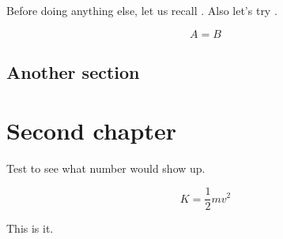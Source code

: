 \documentclass[noocg]{wwwnotes2}
\begin{document}
Before doing anything else, let us recall . Also let's try .

\lipsum[2]

\begin{equation}
	A = B
\end{equation}

\lipsum[3-8]



\section{Another section}

\lipsum[5-9]

\chapter{Second chapter}

Test \theequation to see what number would show up.

\lipsum[10-23]

\begin{equation}
K = \frac12 mv^2
\end{equation}

This is it.
\end{document}
